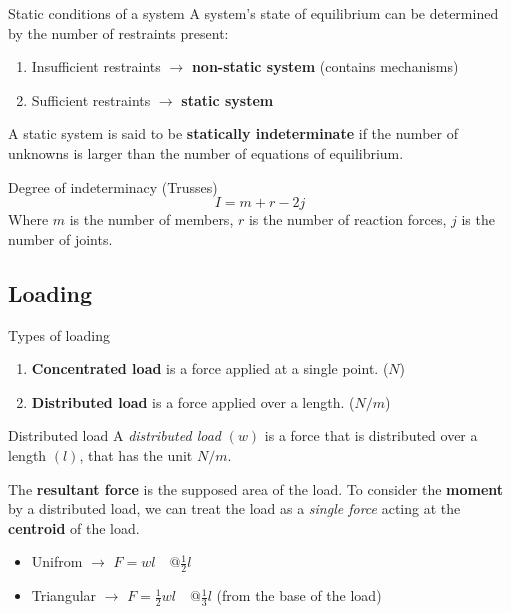 \documentclass{article}
\begin{document}
\begin{definition}
    {Static conditions of a system}
    A system's state of equilibrium can be determined by the number of restraints present:
    \begin{enumerate}
        \item Insufficient restraints $\to$ \textbf{non-static system} (contains mechanisms)
        \item Sufficient restraints $\to$ \textbf{static system}
    \end{enumerate}
    A static system is said to be \textbf{statically indeterminate} if the number of unknowns is larger than the number of equations of equilibrium.
\end{definition}
\begin{theorem}
    {Degree of indeterminacy (Trusses)}
    \[I=m+r-2j\]
    Where $m$ is the number of members, $r$ is the number of reaction forces, $j$ is the number of joints.
\end{theorem}

\subsection{Loading}
\begin{knBox}
    {Types of loading}
    \begin{enumerate}
        \item \textbf{Concentrated load} is a force applied at a single point. ($N$)
        \item \textbf{Distributed load} is a force applied over a length. ($N/m$)
    \end{enumerate}
\end{knBox}
\begin{theorem}
    {Distributed load}
    A \emph{distributed load} $(w)$ is a force that is distributed over a length $(l)$, that has the unit $N/m$.

    The \textbf{resultant force} is the supposed area of the load. To consider the \textbf{moment} by a distributed load, we can treat the load as a \emph{single force} acting at the \textbf{centroid} of the load.
    \begin{itemize}
        \item Unifrom $\to$ $F=wl\quad @\frac{1}{2}l$
        \item Triangular $\to$ $F=\frac{1}{2}wl\quad @ \frac{1}{3}l$  (from the base of the load)
    \end{itemize}
\end{theorem}
\end{document}
